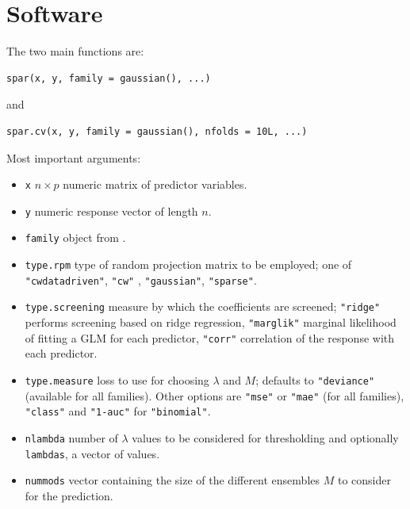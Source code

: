 \documentclass[
  article]{jss}
\newcommand{\fct}[1]{\code{#1()}}
\begin{document}
\section{Software}\label{sec-software}

The two main functions are:

\begin{verbatim}
spar(x, y, family = gaussian(), ...)
\end{verbatim}

and

\begin{verbatim}
spar.cv(x, y, family = gaussian(), nfolds = 10L, ...)
\end{verbatim}

Most important arguments:

\begin{itemize}
\item
  \texttt{x} \(n \times p\) numeric matrix of predictor variables.
\item
  \texttt{y} numeric response vector of length \(n\).
\item
  \texttt{family} object from \fct{stats::family}.
\item
  \texttt{type.rpm} type of random projection matrix to be employed; one
  of \texttt{"cwdatadriven"}, \texttt{"cw"}
  \citet{Clarkson2013LowRankApproxShort}, \texttt{"gaussian"},
  \texttt{"sparse"}.
\end{itemize}

\begin{itemize}
\item
  \texttt{type.screening} measure by which the coefficients are
  screened; \texttt{"ridge"} performs screening based on ridge
  regression, \texttt{"marglik"} marginal likelihood of fitting a GLM
  for each predictor, \texttt{"corr"} correlation of the response with
  each predictor.
\item
  \texttt{type.measure} loss to use for choosing \(\lambda\) and \(M\);
  defaults to \texttt{"deviance"} (available for all families). Other
  options are \texttt{"mse"} or \texttt{"mae"} (for all families),
  \texttt{"class"} and \texttt{"1-auc"} for \texttt{"binomial"}.
\item
  \texttt{nlambda} number of \(\lambda\) values to be considered for
  thresholding and optionally \texttt{lambdas}, a vector of values.
\item
  \texttt{nummods} vector containing the size of the different ensembles
  \(M\) to consider for the prediction.
\end{itemize}
\end{document}
